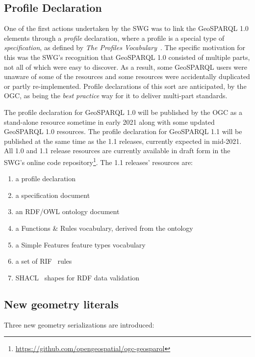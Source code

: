 \documentclass[runningheads]{llncs}
\begin{document}
\subsection{Profile Declaration}\label{sec:profiledec}
One of the first actions undertaken by the SWG was to link the GeoSPARQL 1.0 elements through a \textit{profile} 
declaration, where a profile is a special type of \textit{specification}, as defined by \textit{The Profiles Vocabulary}~\cite{atkinson_profiles_2020}. 
The specific motivation for this was the SWG's recognition that GeoSPARQL 1.0 consisted of multiple parts, not all
of which were easy to discover. As a result, some GeoSPARQL users were unaware of some of the resources and some
resources were accidentally duplicated or partly re-implemented. Profile declarations of this sort are anticipated, by the OGC, 
as being the \textit{best practice} way for it to deliver multi-part standards.

The profile declaration for GeoSPARQL 1.0 will be published by the OGC as a stand-alone resource sometime in early 2021 along with some 
updated GeoSPARQL 1.0 resources. The profile declaration for GeoSPARQL 1.1 will be published at the same time as the 
1.1 releases, currently expected in mid-2021. All 1.0 and 1.1 release resources are currently available in draft form 
in the SWG's online code repository\footnote{\url{https://github.com/opengeospatial/ogc-geosparql}}. The 1.1 releases' resources are:

\begin{enumerate}
    \item a profile declaration
    \item a specification document
    \item an RDF/OWL ontology document
    \item a Functions \& Rules vocabulary, derived from the ontology
    \item a Simple Features feature types vocabulary
    \item a set of RIF~\cite{kifer2013rif} rules
    \item SHACL~\cite{knublauch_shapes_2017} shapes for RDF data validation 
\end{enumerate}


\subsection{New geometry literals}\label{sec:newliterals}
Three new geometry serializations are introduced: 
\end{document}
